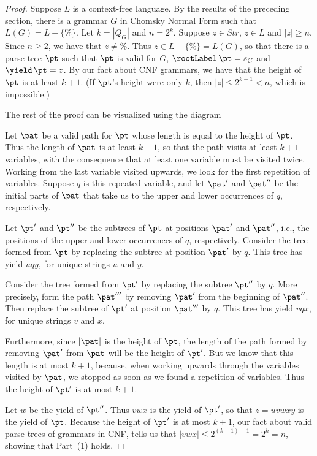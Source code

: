 \begin{proof}
Suppose $L$ is a context-free language.  By the results of the
preceding section, there is a grammar $G$ in Chomsky Normal Form such
that $L(G)=L-\{\%\}$.  Let $k=|Q_G|$ and $n= 2^k$.  Suppose $z\in
Str$, $z\in L$ and $|z|\geq n$.  Since $n\geq 2$, we have that
$z\neq\%$.  Thus $z\in L-\{\%\}=L(G)$, so that there is a parse tree
$\pt$ such that $\pt$ is valid for $G$, $\rootLabel\,\pt=s_G$ and
$\yield\,\pt=z$.  By our fact about CNF grammars, we have that the
height of $\pt$ is at least $k+1$.  (If $\pt$'s height were only $k$,
then $|z|\leq 2^{k-1}<n$, which is impossible.)

The rest of the proof can be visualized using the
diagram
\begin{center}

\end{center}

Let $\pat$ be a valid path for $\pt$ whose length is equal to the
height of $\pt$.  Thus the length of $\pat$ is at least $k+1$, so that
the path visits at least $k+1$ variables, with the consequence that at
least one variable must be visited twice.  Working from the last
variable visited upwards, we look for the first repetition of
variables.  Suppose $q$ is this repeated variable, and let $\pat'$
and $\pat''$ be the initial parts of $\pat$ that take us
to the upper and lower occurrences of $q$, respectively.

Let $\pt'$ and $\pt''$ be the subtrees of $\pt$ at positions
$\pat'$ and $\pat''$, i.e., the positions of the upper and lower
occurrences of $q$, respectively.
Consider the tree formed from $\pt$ by replacing the subtree
at position $\pat'$ by $q$.  This tree has yield
$uqy$, for unique strings $u$ and $y$.

Consider the tree formed from $\pt'$ by replacing the subtree
$\pt''$ by $q$.  More precisely, form the path $\pat'''$ 
by removing $\pat'$ from the beginning of $\pat''$.
Then replace the subtree of $\pt'$ at position $\pat'''$ by
$q$.  This tree has yield $vqx$, for unique strings $v$ and $x$.

Furthermore, since $|\pat|$ is the height of $\pt$, the
length of the path formed by removing $\pat'$ from $\pat$ will be the
height of $\pt'$.  But we know that this length is at most $k+1$,
because, when working upwards through the variables visited by $\pat$,
we stopped as soon as we found a repetition of variables.  Thus the
height of $\pt'$ is at most $k+1$.

Let $w$ be the yield of $\pt''$.  Thus $vwx$ is the yield of $\pt'$,
so that $z=uvwxy$ is the yield of $\pt$.  Because the height of $\pt'$
is at most $k+1$, our fact about valid parse trees of grammars in CNF,
tells us that $|vwx|\leq 2^{(k+1)-1} = 2^k=n$, showing that Part~(1)
holds.


\end{proof}
